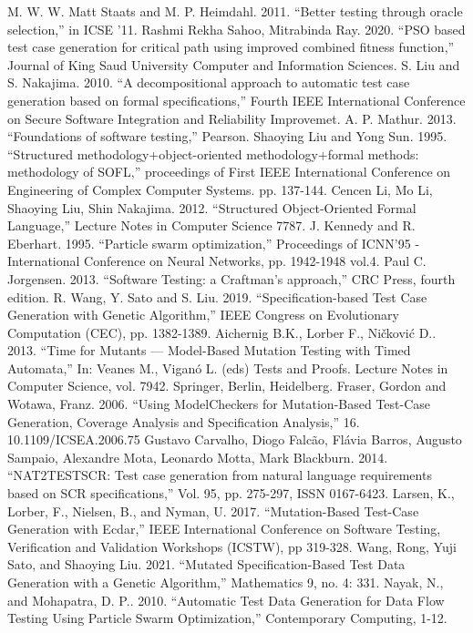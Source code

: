 \documentclass[uplatex, twocolumn, 10pt]{jsarticle} %
\begin{document}
\begin{thebibliography}{99}
     M. W. W. Matt Staats and M. P. Heimdahl. 2011. “Better testing through oracle selection,” in ICSE '11.
     Rashmi Rekha Sahoo, Mitrabinda Ray. 2020. ``PSO based test case generation for critical path using improved combined fitness function,” Journal of King Saud University Computer and Information Sciences.
     S. Liu and S. Nakajima. 2010. “A decompositional approach to automatic test case generation based on formal specifications,” Fourth IEEE International Conference on Secure Software Integration and Reliability Improvemet.
     A. P. Mathur. 2013. ``Foundations of software testing,” Pearson.
     Shaoying Liu and Yong Sun. 1995. ``Structured methodology+object-oriented methodology+formal methods: methodology of SOFL,” proceedings of First IEEE International Conference on Engineering of Complex Computer Systems. pp. 137-144.
     Cencen Li, Mo Li, Shaoying Liu, Shin Nakajima. 2012. ``Structured Object-Oriented Formal Language,” Lecture Notes in Computer Science 7787.
     J. Kennedy and R. Eberhart. 1995. ``Particle swarm optimization,” Proceedings of ICNN'95 - International Conference on Neural Networks, pp. 1942-1948 vol.4.
     Paul C. Jorgensen. 2013. ``Software Testing: a Craftman's approach,” CRC Press, fourth edition.
     R. Wang, Y. Sato and S. Liu. 2019. ``Specification-based Test Case Generation with Genetic Algorithm,” IEEE Congress on Evolutionary Computation (CEC), pp. 1382-1389.
     Aichernig B.K., Lorber F., Ni\v{c}kovi\'c D.. 2013. ``Time for Mutants — Model-Based Mutation Testing with Timed Automata,” In: Veanes M., Vigan\'o L. (eds) Tests and Proofs. Lecture Notes in Computer Science, vol. 7942. Springer, Berlin, Heidelberg.
     Fraser, Gordon and Wotawa, Franz. 2006. ``Using ModelCheckers for Mutation-Based Test-Case Generation, Coverage Analysis and Specification Analysis,” 16. 10.1109/ICSEA.2006.75
     Gustavo Carvalho, Diogo Falc\~ao, Fl\'avia Barros, Augusto Sampaio, Alexandre Mota, Leonardo Motta, Mark Blackburn. 2014. ``NAT2TESTSCR: Test case generation from natural language requirements based on SCR specifications,” Vol. 95, pp. 275-297, ISSN 0167-6423.
     Larsen, K., Lorber, F., Nielsen, B., and Nyman, U. 2017. ``Mutation-Based Test-Case Generation with Ecdar,” IEEE International Conference on Software Testing, Verification and Validation Workshops (ICSTW), pp 319-328.
     Wang, Rong, Yuji Sato, and Shaoying Liu. 2021. ``Mutated Specification-Based Test Data Generation with a Genetic Algorithm,” Mathematics 9, no. 4: 331.
     Nayak, N., and Mohapatra, D. P.. 2010. ``Automatic Test Data Generation for Data Flow Testing Using Particle Swarm Optimization,” Contemporary Computing, 1-12.
\end{thebibliography}
\end{document}
